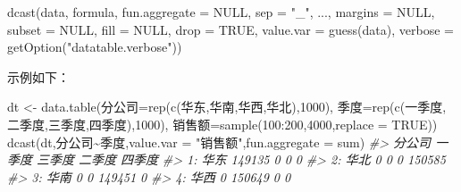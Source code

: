 \documentclass[
]{book}
\newenvironment{Shaded}{\begin{snugshade}}{\end{snugshade}}
\newcommand{\AttributeTok}[1]{\textcolor[rgb]{0.77,0.63,0.00}{#1}}
\newcommand{\CommentTok}[1]{\textcolor[rgb]{0.56,0.35,0.01}{\textit{#1}}}
\newcommand{\ConstantTok}[1]{\textcolor[rgb]{0.00,0.00,0.00}{#1}}
\newcommand{\DecValTok}[1]{\textcolor[rgb]{0.00,0.00,0.81}{#1}}
\newcommand{\FunctionTok}[1]{\textcolor[rgb]{0.00,0.00,0.00}{#1}}
\newcommand{\NormalTok}[1]{#1}
\newcommand{\OtherTok}[1]{\textcolor[rgb]{0.56,0.35,0.01}{#1}}
\newcommand{\SpecialCharTok}[1]{\textcolor[rgb]{0.00,0.00,0.00}{#1}}
\newcommand{\StringTok}[1]{\textcolor[rgb]{0.31,0.60,0.02}{#1}}
\begin{document}
\begin{Shaded}
\begin{Highlighting}[]
\FunctionTok{dcast}\NormalTok{(data, formula, }\AttributeTok{fun.aggregate =} \ConstantTok{NULL}\NormalTok{, }\AttributeTok{sep =} \StringTok{"\_"}\NormalTok{,}
\NormalTok{    ..., }\AttributeTok{margins =} \ConstantTok{NULL}\NormalTok{, }\AttributeTok{subset =} \ConstantTok{NULL}\NormalTok{, }\AttributeTok{fill =} \ConstantTok{NULL}\NormalTok{,}
    \AttributeTok{drop =} \ConstantTok{TRUE}\NormalTok{, }\AttributeTok{value.var =} \FunctionTok{guess}\NormalTok{(data),}
    \AttributeTok{verbose =} \FunctionTok{getOption}\NormalTok{(}\StringTok{"datatable.verbose"}\NormalTok{))}
\end{Highlighting}
\end{Shaded}

示例如下：

\begin{Shaded}
\begin{Highlighting}[]
\NormalTok{dt }\OtherTok{\textless{}{-}} \FunctionTok{data.table}\NormalTok{(分公司}\OtherTok{=}\FunctionTok{rep}\NormalTok{(}\FunctionTok{c}\NormalTok{(}\StringTok{\textquotesingle{}华东\textquotesingle{}}\NormalTok{,}\StringTok{\textquotesingle{}华南\textquotesingle{}}\NormalTok{,}\StringTok{\textquotesingle{}华西\textquotesingle{}}\NormalTok{,}\StringTok{\textquotesingle{}华北\textquotesingle{}}\NormalTok{),}\DecValTok{1000}\NormalTok{),}
\NormalTok{              季度}\OtherTok{=}\FunctionTok{rep}\NormalTok{(}\FunctionTok{c}\NormalTok{(}\StringTok{\textquotesingle{}一季度\textquotesingle{}}\NormalTok{,}\StringTok{\textquotesingle{}二季度\textquotesingle{}}\NormalTok{,}\StringTok{\textquotesingle{}三季度\textquotesingle{}}\NormalTok{,}\StringTok{\textquotesingle{}四季度\textquotesingle{}}\NormalTok{),}\DecValTok{1000}\NormalTok{),}
\NormalTok{              销售额}\OtherTok{=}\FunctionTok{sample}\NormalTok{(}\DecValTok{100}\SpecialCharTok{:}\DecValTok{200}\NormalTok{,}\DecValTok{4000}\NormalTok{,}\AttributeTok{replace =} \ConstantTok{TRUE}\NormalTok{))}
\FunctionTok{dcast}\NormalTok{(dt,分公司}\SpecialCharTok{\textasciitilde{}}\NormalTok{季度,}\AttributeTok{value.var =} \StringTok{"销售额"}\NormalTok{,}\AttributeTok{fun.aggregate =}\NormalTok{ sum)}
\CommentTok{\#\textgreater{}    分公司 一季度 三季度 二季度 四季度}
\CommentTok{\#\textgreater{} 1:   华东 149135      0      0      0}
\CommentTok{\#\textgreater{} 2:   华北      0      0      0 150585}
\CommentTok{\#\textgreater{} 3:   华南      0      0 149451      0}
\CommentTok{\#\textgreater{} 4:   华西      0 150649      0      0}
\end{Highlighting}
\end{Shaded}
\end{document}
